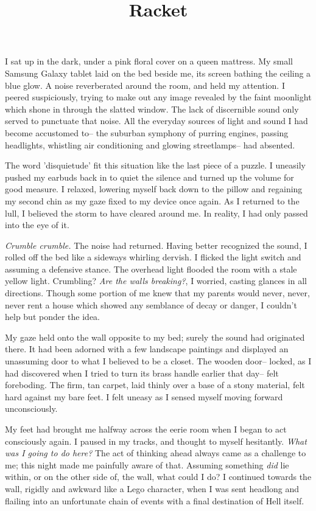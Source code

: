 \documentclass[12pt]{article}
\title{Racket}
\begin{document}
\makeheader
\hspace{0.5in}
I sat up in the dark, under a pink floral cover on a queen mattress.  My small Samsung Galaxy tablet laid on the bed beside me, its screen bathing the ceiling a blue glow.  A noise reverberated around the room, and held my attention.  I peered suspiciously, trying to make out any image revealed by the faint moonlight which shone in through the slatted window.  The lack of discernible sound only served to punctuate that noise.  All the everyday sources of light and sound I had become accustomed to-- the suburban symphony of purring engines, passing headlights, whistling air conditioning and glowing streetlamps-- had absented.

The word 'disquietude' fit this situation like the last piece of a puzzle.  I uneasily pushed my earbuds back in to quiet the silence and turned up the volume for good measure.  I relaxed, lowering myself back down to the pillow and regaining my second chin as my gaze fixed to my device once again.  As I returned to the lull, I believed the storm to have cleared around me.  In reality, I had only passed into the eye of it.

\textit{Crumble crumble.}  The noise had returned.  Having better recognized the sound, I rolled off the bed like a sideways whirling dervish.  I flicked the light switch and assuming a defensive stance.  The overhead light flooded the room with a stale yellow light.  Crumbling?  \textit{Are the walls breaking?}, I worried, casting glances in all directions.  Though some portion of me knew that my parents would never, never, never rent a house which showed any semblance of decay or danger, I couldn't help but ponder the idea.

My gaze held onto the wall opposite to my bed; surely the sound had originated there.  It had been adorned with a few landscape paintings and displayed an unassuming door to what I believed to be a closet.  The wooden door-- locked, as I had discovered when I tried to turn its brass handle earlier that day-- felt foreboding.  The firm, tan carpet, laid thinly over a base of a stony material, felt hard against my bare feet.  I felt uneasy as I sensed myself moving forward unconsciously.

My feet had brought me halfway across the eerie room when I began to act consciously again.  I paused in my tracks, and thought to myself hesitantly.  \textit{What was I going to do here?}  The act of thinking ahead always came as a challenge to me;  this night made me painfully aware of that.  Assuming something \textit{did} lie within, or on the other side of, the wall, what could I do?  I continued towards the wall, rigidly and awkward like a Lego character, when I was sent headlong and flailing into an unfortunate chain of events with a final destination of Hell itself.
\end{document}
